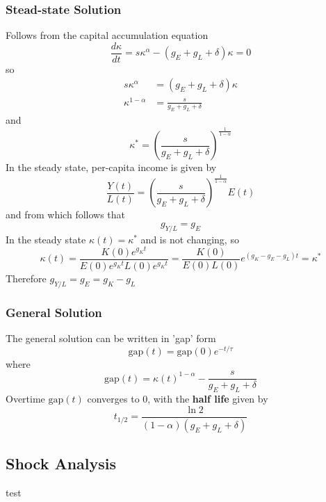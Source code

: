 \documentclass[a4paper]{article}
\begin{document}
\subsubsection*{Stead-state Solution}
Follows from the capital accumulation equation
\[ \frac{d\kappa}{dt} = s\kappa^\alpha - (g_E + g_L + \delta)\kappa = 0 \]
so \begin{align*}
    s\kappa^\alpha &= (g_E + g_L + \delta)\kappa \\
    \kappa^{1-\alpha} &= \frac{s}{g_E + g_L + \delta}
\end{align*}
and
\begin{equation*}
    \boxed{\kappa^* = (\frac{s}{g_E + g_L + \delta})^\frac{1}{1 - \alpha}}
\end{equation*}
In the steady state, per-capita income is given by
\[ \frac{Y(t)}{L(t)}  = (\frac{s}{g_E + g_L + \delta})^\frac{1}{1 - \alpha}E(t) \]
and from which follows that
\[ g_{Y/L} = g_E \]
In the steady state $\kappa(t) = \kappa^*$ and is not changing, so
\[ \kappa(t) = \frac{K(0)e^{g_Kt}}{E(0)e^{g_Kt}L(0)e^{g_Kt}} 
= \frac{K(0)}{E(0)L(0)}e^{(g_K-g_E-g_L)t} = \kappa^* \]
Therefore $g_{Y/L} = g_E = g_K - g_L$

\subsubsection*{General Solution}
The general solution can be written in 'gap' form
\[ \text{gap}(t) = \text{gap}(0)e^{-t/\tau} \]
where
\[ \text{gap}(t) = \kappa(t)^{1-\alpha} - \frac{s}{g_E + g_L + \delta} \]
Overtime $\text{gap}(t)$ converges to 0, with the \textbf{half life} given by
\[ \boxed{t_{1/2} = \frac{\ln 2}{(1 - \alpha)(g_E + g_L + \delta)}} \]

\subsection{Shock Analysis}
test
\end{document}

